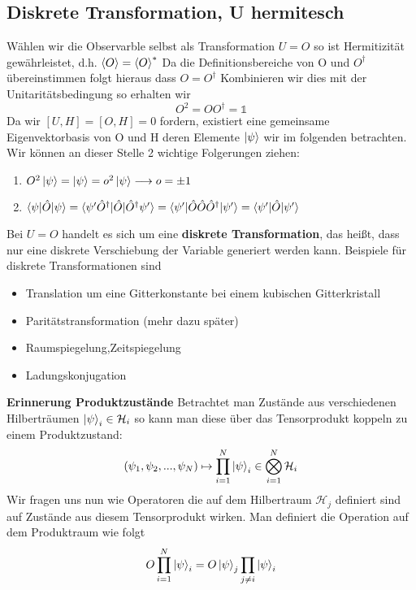\documentclass[Ex4_Zusammenfassung.tex]{subfiles}
\begin{document}
\subsection{Diskrete Transformation, U hermitesch}
Wählen wir die Observarble selbst als Transformation $U=O$ so ist Hermitizität gewährleistet, d.h. $\braket{O} = \braket{O}^{*}$ \newline Da die Definitionsbereiche von O und $O^{\dag}$ übereinstimmen folgt hieraus dass $O=O^{\dag}$ \newline Kombinieren wir dies mit der Unitaritätsbedingung so erhalten wir 
\begin{equation}
O^2 = OO^{\dag} = \mathds{1}
\end{equation}
Da wir $[U,H]=[O,H]=0$ fordern, existiert eine gemeinsame Eigenvektorbasis von O und H deren Elemente $\ket{\psi}$ wir im folgenden betrachten.
Wir können an dieser Stelle 2 wichtige Folgerungen ziehen:
\begin{enumerate}
\item $O^2 \ket{\psi} = \ket{\psi} = o^2 \ket{\psi} \longrightarrow o = \pm 1$
\item $ \braket{\psi|\hat{O}|\psi} = \braket{\psi' \hat{O}^{\dag}|\hat{O}|\hat{O}^{\dag} \psi'} =  \braket{\psi'|\hat{O} \hat{O} \hat{O}^{\dag}|\psi'} = \braket{\psi'|\hat{O}|\psi'}$
\end{enumerate}
Bei $U=O$ handelt es sich um eine \textbf{diskrete Transformation}, das heißt, dass nur eine diskrete Verschiebung der Variable generiert werden kann. Beispiele für diskrete Transformationen sind 
\begin{itemize}
\item Translation um eine Gitterkonstante bei einem kubischen Gitterkristall
\item Paritätstransformation  (mehr dazu später)
\item Raumspiegelung,Zeitspiegelung
\item Ladungskonjugation
\end{itemize}
\textbf{Erinnerung Produktzustände} \newline
Betrachtet man Zustände aus verschiedenen Hilberträumen $\ket{\psi}_i \in \mathcal{H}_i$ so kann man diese über das Tensorprodukt koppeln zu einem Produktzustand:
\begin{equation}
(\psi_1,\psi_2,...,\psi_N) \mapsto \prod_{i=1}^N \ket{\psi}_i \in \bigotimes_{i=1}^N \mathcal{H}_i
\end{equation}
Wir fragen uns nun wie Operatoren die auf dem Hilbertraum $\mathcal{H}_j$ definiert sind auf Zustände aus diesem Tensorprodukt wirken. Man definiert die Operation auf dem Produktraum wie folgt
\begin{equation}
O \prod_{i=1}^N \ket{\psi}_i = O \ket{\psi}_j \prod_{j\neq i} \ket{\psi}_i
\end{equation}
\end{document}
